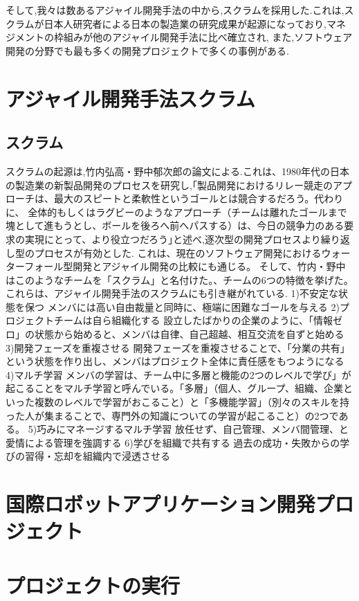 \documentclass[paper]{jrsj}
\begin{document}
そして,我々は数あるアジャイル開発手法の中から,スクラムを採用した.これは,スクラムが日本人研究者による日本の製造業の研究成果が起源になっており,マネジメントの枠組みが他のアジャイル開発手法に比べ確立され, また,ソフトウェア開発の分野でも最も多くの開発プロジェクトで多くの事例がある.

\section{アジャイル開発手法スクラム}
\subsection{スクラム}
スクラムの起源は,竹内弘高・野中郁次郎の論文による.これは、1980年代の日本の製造業の新製品開発のプロセスを研究し,｢製品開発におけるリレー競走のアプローチは、最大のスピートと柔軟性というゴールとは競合するだろう。代わりに、 全体的もしくはラグビーのようなアプローチ（チームは離れたゴールまで塊として進もうとし、ボールを後ろへ前へパスする）は、今日の競争力のある要求の実現にとって、より役立つだろう｣と述べ,逐次型の開発プロセスより繰り返し型のプロセスが有効とした.
これは、現在のソフトウェア開発におけるウォーターフォール型開発とアジャイル開発の比較にも通じる。
そして、竹内・野中はこのようなチームを「スクラム」と名付けた。、チームの6つの特徴を挙げた。これらは、アジャイル開発手法のスクラムにも引き継がれている.
1)不安定な状態を保つ
メンバには高い自由裁量と同時に、極端に困難なゴールを与える
2)プロジェクトチームは自ら組織化する
設立したばかりの企業のように、「情報ゼロ」の状態から始めると、メンバは自律、自己超越、相互交流を自ずと始める
3)開発フェーズを重複させる
開発フェーズを重複させることで、「分業の共有」という状態を作り出し、メンバはプロジェクト全体に責任感をもつようになる
4)マルチ学習
メンバの学習は、チーム中に多層と機能の2つのレベルで学び」が起こることをマルチ学習と呼んでいる。「多層」（個人、グループ、組織、企業といった複数のレベルで学習がおこること）と「多機能学習」（別々のスキルを持った人が集まることで、専門外の知識についての学習が起こること）の2つである。
5)巧みにマネージするマルチ学習
放任せず、自己管理、メンバ間管理、と愛情による管理を強調する
6)学びを組織で共有する
過去の成功・失敗からの学びの習得・忘却を組織内で浸透させる

\section{国際ロボットアプリケーション開発プロジェクト}
\section{プロジェクトの実行}
\end{document}
